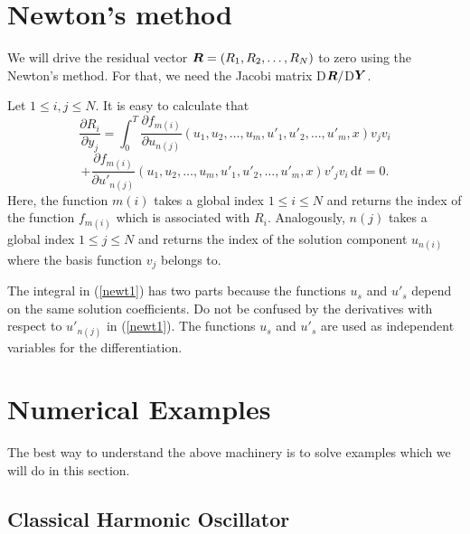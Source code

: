 \documentclass[12pt]{article}
\newcommand{\bfY}{\mbox{\boldmath $Y$}}
\newcommand{\bfR}{\mbox{\boldmath $R$}}
\def\be{\begin{equation}}
\def\ee{\end{equation}}
\def\d{\mbox{d}}
\begin{document}
\section{Newton's method}

We will drive the residual vector $\bfR = (R_1, R_2, \ldots, R_N)$ to zero
using the Newton's method. For that, we need the Jacobi matrix D$\bfR/$D$\bfY$.

Let $1 \le i, j \le N$.
It is easy to calculate that
$$
\frac{\partial R_i}{\partial y_j}
= \int_0^T \frac{\partial f_{m(i)}}{\partial u_{n(j)}}(u_1, u_2, \ldots, u_m, u'_1, u'_2, \ldots, u'_m, x)v_jv_i
$$
\be\label{newt1}
+ \frac{\partial f_{m(i)}}{\partial u'_{n(j)}}(u_1, u_2, \ldots, u_m, u'_1, u'_2, \ldots, u'_m, x)v'_jv_i \, \d t = 0.
\ee
Here, the function $m(i)$ takes a global index $1 \le i \le N$ and returns the
index of the function $f_{m(i)}$ which is associated with $R_i$. Analogously,
$n(j)$ takes a global index $1 \le j \le N$ and returns the index of the
solution component $u_{n(i)}$ where the basis function $v_j$ belongs to.

The integral in (\ref{newt1}) has two parts because the functions $u_s$ and
$u'_s$ depend on the same solution coefficients.  Do not be confused by the
derivatives with respect to $u'_{n(j)}$ in (\ref{newt1}).  The functions $u_s$
and $u'_s$ are used as independent variables for the differentiation.


\section{Numerical Examples}

The best way to understand the above machinery is to solve examples which we
will do in this section.

\subsection{Classical Harmonic Oscillator}
\end{document}
